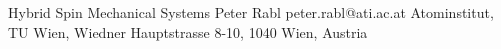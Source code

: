 \begin{conf-abstract}[]
{Hybrid Spin Mechanical Systems}
{\color{blue} Peter Rabl}
{peter.rabl@ati.ac.at}
{Atominstitut, TU Wien, Wiedner Hauptstrasse 8-10, 1040 Wien, Austria}
{\decofourleft \decofourright}





\printbibliography[heading=none]

\end{conf-abstract}
